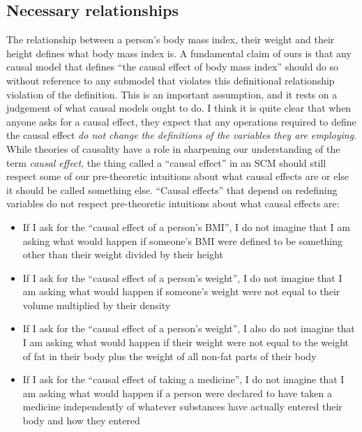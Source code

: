 

\subsection{Necessary relationships}

The relationship between a person's body mass index, their weight and their height defines what body mass index is. A fundamental claim of ours is that any causal model that defines ``the causal effect of body mass index'' should do so without reference to any submodel that violates this definitional relationship violation of the definition. This is an important assumption, and it rests on a judgement of what causal models ought to do. I think it is quite clear that when anyone asks for a causal effect, they expect that any operations required to define the causal effect \emph{do not change the definitions of the variables they are employing}. While theories of causality have a role in sharpening our understanding of the term \emph{causal effect}, the thing called a ``causal effect'' in an SCM should still respect some of our pre-theoretic intuitions about what causal effects are or else it should be called something else. ``Causal effects'' that depend on redefining variables do not respect pre-theoretic intuitions about what causal effects are:

\begin{itemize}
    \item If I ask for the ``causal effect of a person's BMI'', I do not imagine that I am asking what would happen if someone's BMI were defined to be something other than their weight divided by their height
    \item If I ask for the ``causal effect of a person's weight'', I do not imagine that I am asking what would happen if someone's weight were not equal to their volume multiplied by their density
    \item If I ask for the ``causal effect of a person's weight'', I also do not imagine that I am asking what would happen if their weight were not equal to the weight of fat in their body plus the weight of all non-fat parts of their body
    \item If I ask for the ``causal effect of taking a medicine'', I do not imagine that I am asking what would happen if a person were declared to have taken a medicine independently of whatever substances have actually entered their body and how they entered
\end{itemize}

